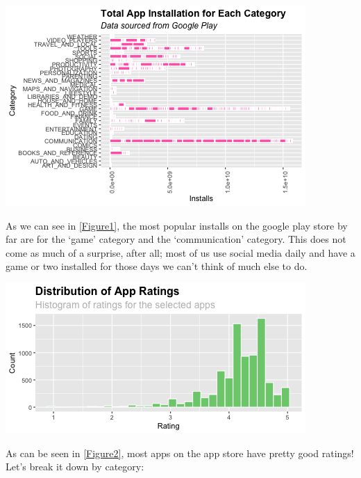 \documentclass[11pt,preprint, authoryear]{elsarticle}
\let\origfigure\figure
\let\endorigfigure\endfigure
\renewenvironment{figure}[1][2] {
    \expandafter\origfigure\expandafter[H]
} {
    \endorigfigure
}
\numberwithin{equation}{section}
\numberwithin{figure}{section}
\numberwithin{table}{section}
\begin{document}
\begin{figure}[H]

{\centering \includegraphics{q5_files/figure-latex/Figure1-1} 

}

\caption{Application Installation by Category \label{Figure1}}\label{fig:Figure1}
\end{figure}

As we can see in \ref{Figure1}, the most popular installs on the google
play store by far are for the `game' category and the `communication'
category. This does not come as much of a surprise, after all; most of
us use social media daily and have a game or two installed for those
days we can't think of much else to do.

\begin{figure}[H]

{\centering \includegraphics{q5_files/figure-latex/Figure2-1} 

}

\caption{Ratings of Applications based on Categories \label{Figure2}}\label{fig:Figure2}
\end{figure}

As can be seen in \ref{Figure2}, most apps on the app store have pretty
good ratings! Let's break it down by category:
\end{document}
